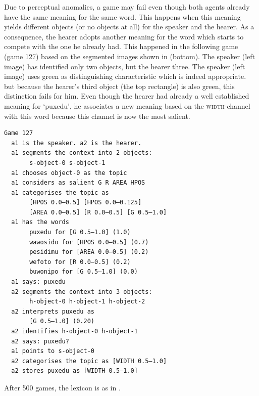 Due to perceptual anomalies, a game may fail even though 
both agents already have the same meaning for the 
same word. This happens when this meaning yields different 
objects (or no objects at all) for the speaker and the hearer. 
As a consequence, the hearer adopts another meaning for 
the word which starts to compete with the one he already had. 
This happened in the following game (game 127)
based on the segmented images shown in  (bottom). The speaker (left image) has identified
only two objects, but the hearer three. The 
speaker (left image) uses green as distinguishing 
characteristic which is indeed appropriate. but 
because the hearer's third object (the top rectangle) is 
also green, this distinction fails for him.  
Even though the hearer had already a well established
meaning for `puxedu', he associates a new meaning 
based on the \textsc{width}-channel with this word because this 
channel is now the most salient. 
\begin{verbatim}
Game 127
  a1 is the speaker. a2 is the hearer. 
  a1 segments the context into 2 objects: 
       s-object-0 s-object-1
  a1 chooses object-0 as the topic 
  a1 considers as salient G R AREA HPOS 
  a1 categorises the topic as 
       [HPOS 0.0–0.5] [HPOS 0.0–0.125]
       [AREA 0.0–0.5] [R 0.0–0.5] [G 0.5–1.0]
  a1 has the words
       puxedu for [G 0.5–1.0] (1.0)
       wawosido for [HPOS 0.0–0.5] (0.7)
       pesidimu for [AREA 0.0–0.5] (0.2)
       wefoto for [R 0.0–0.5] (0.2)
       buwonipo for [G 0.5–1.0] (0.0)
  a1 says: puxedu
  a2 segments the context into 3 objects: 
       h-object-0 h-object-1 h-object-2
  a2 interprets puxedu as
       [G 0.5–1.0] (0.20)
  a2 identifies h-object-0 h-object-1
  a2 says: puxedu?
  a1 points to s-object-0
  a2 categorises the topic as [WIDTH 0.5–1.0]
  a2 stores puxedu as [WIDTH 0.5–1.0]
\end{verbatim}

After 500 games, the lexicon is as in . 

